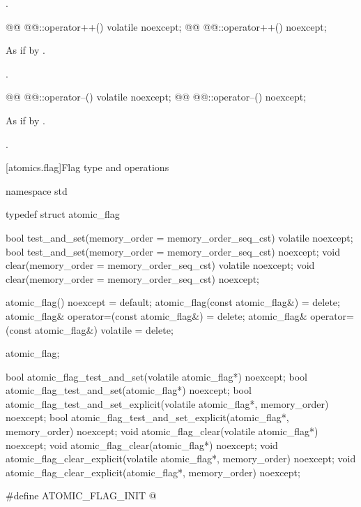\begin{itemdescr}
\pnum
\returns {}.
\end{itemdescr}

%
\begin{itemdecl}
@@ @@::operator++() volatile noexcept;
@@ @@::operator++() noexcept;
\end{itemdecl}

\begin{itemdescr}
\pnum
\effects As if by .

\pnum
\returns {}.
\end{itemdescr}

%
\begin{itemdecl}
@@ @@::operator--() volatile noexcept;
@@ @@::operator--() noexcept;
\end{itemdecl}

\begin{itemdescr}
\pnum
\effects As if by .

\pnum
\returns {}.
\end{itemdescr}

[atomics.flag]{Flag type and operations}

\begin{codeblock}
namespace std {
  typedef struct atomic_flag {
    bool test_and_set(memory_order = memory_order_seq_cst) volatile noexcept;
    bool test_and_set(memory_order = memory_order_seq_cst) noexcept;
    void clear(memory_order = memory_order_seq_cst) volatile noexcept;
    void clear(memory_order = memory_order_seq_cst) noexcept;

    atomic_flag() noexcept = default;
    atomic_flag(const atomic_flag&) = delete;
    atomic_flag& operator=(const atomic_flag&) = delete;
    atomic_flag& operator=(const atomic_flag&) volatile = delete;
  } atomic_flag;

  bool atomic_flag_test_and_set(volatile atomic_flag*) noexcept;
  bool atomic_flag_test_and_set(atomic_flag*) noexcept;
  bool atomic_flag_test_and_set_explicit(volatile atomic_flag*, memory_order) noexcept;
  bool atomic_flag_test_and_set_explicit(atomic_flag*, memory_order) noexcept;
  void atomic_flag_clear(volatile atomic_flag*) noexcept;
  void atomic_flag_clear(atomic_flag*) noexcept;
  void atomic_flag_clear_explicit(volatile atomic_flag*, memory_order) noexcept;
  void atomic_flag_clear_explicit(atomic_flag*, memory_order) noexcept;

  #define ATOMIC_FLAG_INIT @\seebelow@
}
\end{codeblock}

